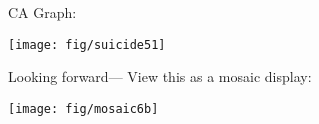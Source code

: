 \begin{frame}
CA Graph:
 \begin{center}
  \texttt{[image: fig/suicide51]}
 \end{center}
\end{frame}

\begin{frame}
Looking forward--- View this as a mosaic display:
 \begin{center}
  \texttt{[image: fig/mosaic6b]}
 \end{center}
\end{frame}

\endinput
\begin{frame}
  \frametitle{}
  \begin{itemize}
	\item{\large\bfseries }
      \begin{itemize*}
	  \item 
    	\begin{itemize*}
		\item 
		\item 
		\end{itemize*}
	  \item 
	  \end{itemize*}
	\item{\large\bfseries }
	\item{\large\bfseries }
  \end{itemize}
\end{frame}

